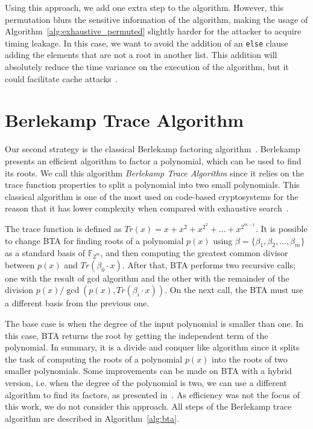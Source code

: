Using this approach, we add one extra step to the algorithm. However, this permutation blurs the sensitive information of the algorithm, making the usage of Algorithm~\ref{alg:exhaustive_permuted} slightly harder for the attacker to acquire timing leakage. In this case, we want to avoid the addition of an \texttt{else} clause adding the elements that are not a root in another list. This addition will absolutely reduce the time variance on the execution of the algorithm, but it could facilitate cache attacks~\cite{dan2005}.

\section{Berlekamp Trace Algorithm}
Our second strategy is the classical Berlekamp factoring algorithm~\cite{berlekamp1970factoring}. Berlekamp presents an efficient algorithm to factor a polynomial, which can be used to find its roots. We call this algorithm \emph{Berlekamp Trace Algorithm} since it relies on the trace function properties to split a polynomial into two small polynomials. This classical algorithm is one of the most used on code-based cryptosystems for the reason that it has lower complexity when compared with exhaustive search~\cite{biswas2009efficient}. 

The trace function is defined as $Tr(x) = x + x^{2} + x^{2^{2}} + \dots + x^{2^{m-1}}$. It is possible to change BTA for finding roots of a polynomial $p(x)$ using $\beta = \{\beta_1, \beta_2, \ldots, \beta_m\}$ as a standard basis of $\mathbb{F}_{2^{m}}$, and then computing the greatest common divisor between $p(x)$ and $Tr(\beta_0 \cdot x)$. After that, BTA performs two recursive calls; one with the result of gcd algorithm and the other with the remainder of the division $p(x) / \gcd(p(x), Tr(\beta_i \cdot x))$. On the next call, the BTA must use a different basis from the previous one. 

The base case is when the degree of the input polynomial is smaller than one. In this case, BTA returns the root by getting the independent term of the polynomial. In summary, it is a divide and conquer like algorithm since it splits the task of computing the roots of a polynomial $p(x)$ into the roots of two smaller polynomials. Some improvements can be made on BTA with a hybrid version, i.e. when the degree of the polynomial is two, we can use a different algorithm to find its factors, as presented in~\cite{strenzke2012fast}. As efficiency was not the focus of this work, we do not consider this approach. All steps of the Berlekamp trace algorithm are described in Algorithm~\ref{alg:bta}.


